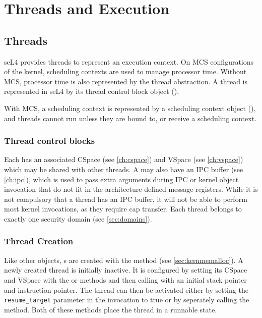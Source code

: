 %
%
%

\chapter{\label{ch:threads}Threads and Execution}

\section{Threads}
\label{sec:threads}


seL4 provides threads to represent an execution context. On MCS configurations of
the kernel, scheduling contexts are used to manage processor time. Without MCS, processor
time is also represented by the thread abstraction.
A thread is represented in seL4 by its thread control block
object ().

With MCS, a scheduling context is represented by a scheduling context object
(), and threads cannot run unless they are bound to, or receive a
scheduling context.

\subsection{Thread control blocks}

Each  has an associated CSpace (see
\autoref{ch:cspace}) and VSpace (see \autoref{ch:vspace}) which
may be shared with other threads. A  may also have an IPC buffer
(see  \autoref{ch:ipc}), which is used to pass extra arguments during IPC
or kernel object invocation that do not fit in the architecture-defined message
registers. While it is not compulsory that a thread has an IPC buffer,
it will not be able to perform most kernel invocations, as they require
cap transfer.
Each thread belongs to exactly one security domain (see
\autoref{sec:domains}).

\subsection{Thread Creation}
\label{sec:thread_creation}

Like other objects, s are created with the
 method (see
\autoref{sec:kernmemalloc}). A newly created thread is initially inactive. It
is configured by setting its CSpace and VSpace with the
or  methods and then calling
 with an initial stack pointer and instruction
pointer. The thread can then be activated either by setting the
\texttt{resume\_target} parameter in the  invocation to true
or by seperately calling the  method. Both of these methods
place the thread in a runnable state.

